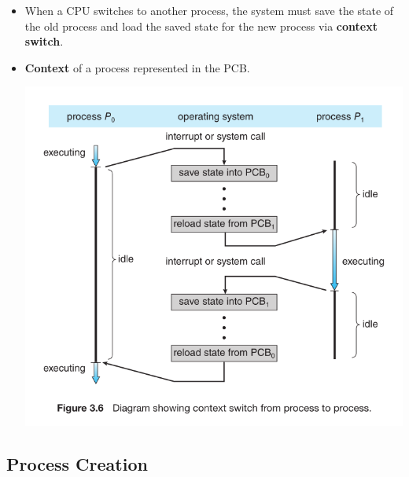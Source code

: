 \documentclass[10pt]{article}
\newcommand{\tf}{\textbf}
\begin{document}
\begin{itemize}
	\item When a CPU switches to another process, the system must save the state of the old process and load the saved state for the new process via \tf{context switch}.
	\item \tf{Context} of a process represented in the PCB.
	
	\bigbreak
	\includegraphics[scale = 0.7]{ContextSwitch.png}
	\bigbreak
\end{itemize}

\subsection{Process Creation}
\end{document}
